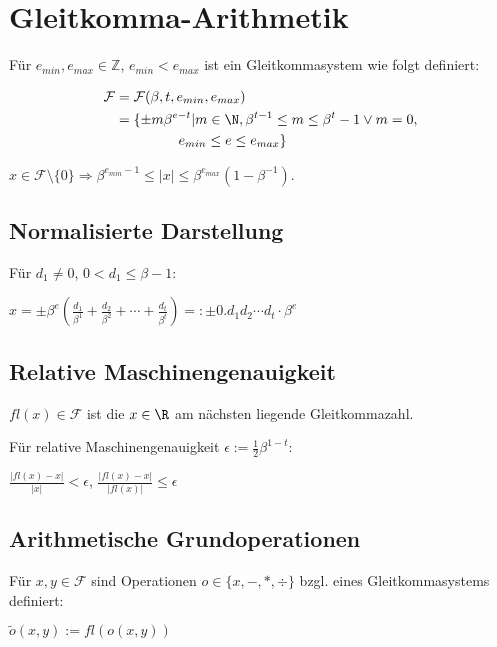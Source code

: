 \section*{Gleitkomma-Arithmetik}

Für $e_{min}, e_{max} \in \mathbb{Z}$, $e_{min} < e_{max}$ ist ein Gleitkommasystem wie folgt definiert:

\vspace*{-4mm}
\begin{align*}
	\mathcal{F} &= \mathcal{F}(\beta,t,e_{min},e_{max}) \\
	            &= \{ \pm m \beta^{e-t} | m \in \N, \beta^{t-1} \leq m \leq \beta^t - 1 \lor m = 0, \\ & \hspace*{16mm}e_{min} \leq e \leq e_{max} \}
\end{align*}

$x \in \mathcal{F} \setminus \{0\} \Rightarrow \beta^{e_{min}-1} \leq |x| \leq \beta^{e_{max}}(1-\beta^{-1})$.

\subsection*{Normalisierte Darstellung}

Für $d_1 \neq 0$, $0 < d_1 \leq \beta - 1$:

$x=\pm \beta^e ( \frac{d_1}{\beta^1} + \frac{d_2}{\beta^2} + \cdots + \frac{d_t}{\beta^t} ) =: \pm 0.d_1 d_2 \cdots d_t \cdot \beta^e$

\subsection*{Relative Maschinengenauigkeit}

$fl(x) \in \mathcal{F}$ ist die $x \in \R$ am nächsten liegende Gleitkommazahl.

Für relative Maschinengenauigkeit $\epsilon := \frac{1}{2} \beta^{1-t}$:

$\frac{|fl(x)-x|}{|x|} < \epsilon$, $\frac{|fl(x)-x|}{|fl(x)|} \leq \epsilon$

\subsection*{Arithmetische Grundoperationen}

Für $x, y \in \mathcal{F}$ sind Operationen $o \in \{x,-,*,\div\}$ bzgl. eines Gleitkommasystems definiert:

$\tilde o(x,y) := fl(o(x,y))$

